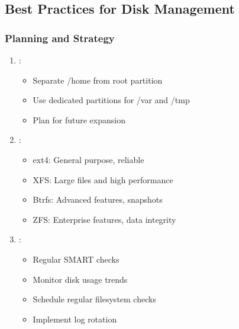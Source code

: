 \documentclass[letterpaper,10pt,english]{sphinxmanual}
\begin{document}
\subsection{Best Practices for Disk Management}
\label{\detokenize{disk-management:best-practices-for-disk-management}}

\subsubsection{Planning and Strategy}
\label{\detokenize{disk-management:planning-and-strategy}}\begin{enumerate}
%
\item {} 
\sphinxAtStartPar
{}:
\begin{itemize}
\item {} 
\sphinxAtStartPar
Separate /home from root partition

\item {} 
\sphinxAtStartPar
Use dedicated partitions for /var and /tmp

\item {} 
\sphinxAtStartPar
Plan for future expansion

\end{itemize}

\item {} 
\sphinxAtStartPar
{}:
\begin{itemize}
\item {} 
\sphinxAtStartPar
ext4: General purpose, reliable

\item {} 
\sphinxAtStartPar
XFS: Large files and high performance

\item {} 
\sphinxAtStartPar
Btrfs: Advanced features, snapshots

\item {} 
\sphinxAtStartPar
ZFS: Enterprise features, data integrity

\end{itemize}

\item {} 
\sphinxAtStartPar
{}:
\begin{itemize}
\item {} 
\sphinxAtStartPar
Regular SMART checks

\item {} 
\sphinxAtStartPar
Monitor disk usage trends

\item {} 
\sphinxAtStartPar
Schedule regular filesystem checks

\item {} 
\sphinxAtStartPar
Implement log rotation

\end{itemize}

\end{enumerate}
\end{document}
